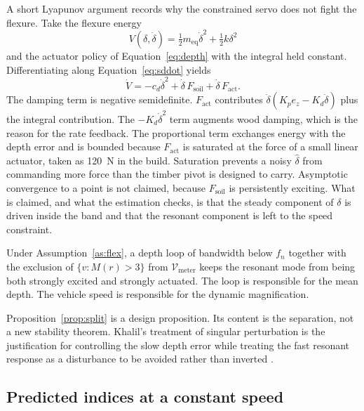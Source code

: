 A short Lyapunov argument records why the constrained servo does not fight the flexure. Take the flexure energy
\begin{equation}
\label{eq:energy}
V(\delta,\dot{\delta}) = \tfrac12 m_{\mathrm{eq}}\dot{\delta}^2 + \tfrac12 k\delta^2
\end{equation}
and the actuator policy of Equation~\eqref{eq:depth} with the integral held constant. Differentiating along Equation~\eqref{eq:sddot} yields
\begin{equation}
\label{eq:vdot}
\dot{V} = -c_d\dot{\delta}^2 + \dot{\delta}\, F_{\mathrm{soil}} + \dot{\delta}\, F_{\mathrm{act}}.
\end{equation}
The damping term is negative semidefinite. \(F_{\mathrm{act}}\) contributes \(\dot{\delta}(K_p e_z - K_d\dot{\delta})\) plus the integral contribution. The \(-K_d\dot{\delta}^2\) term augments wood damping, which is the reason for the rate feedback. The proportional term exchanges energy with the depth error and is bounded because \(F_{\mathrm{act}}\) is saturated at the force of a small linear actuator, taken as \SI{120}{N} in the build. Saturation prevents a noisy \(\hat{\delta}\) from commanding more force than the timber pivot is designed to carry. Asymptotic convergence to a point is not claimed, because \(F_{\mathrm{soil}}\) is persistently exciting. What is claimed, and what the estimation checks, is that the steady component of \(\delta\) is driven inside the band and that the resonant component is left to the speed constraint.

\begin{proposition}
\label{prop:split}
Under Assumption~\ref{as:flex}, a depth loop of bandwidth below \(f_n\) together with the exclusion of \(\{v:M(r)>3\}\) from \(\mathcal{V}_{\mathrm{meter}}\) keeps the resonant mode from being both strongly excited and strongly actuated. The loop is responsible for the mean depth. The vehicle speed is responsible for the dynamic magnification.
\end{proposition}

Proposition~\ref{prop:split} is a design proposition. Its content is the separation, not a new stability theorem. Khalil's treatment of singular perturbation is the justification for controlling the slow depth error while treating the fast resonant response as a disturbance to be avoided rather than inverted \cite{khalil2002}.

\subsection{Predicted indices at a constant speed}

